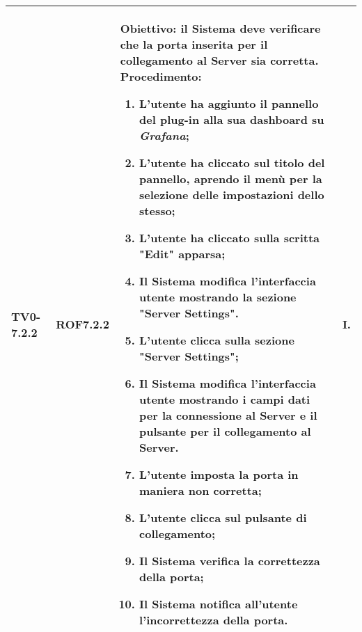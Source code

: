 \begin{longtable}{|C{.15\textwidth}|C{.13\textwidth}|m{.52\textwidth}|C{.08\textwidth}|}
TV0-7.2.2 & ROF7.2.2 &
	\textbf{Obiettivo}: il Sistema deve verificare che la porta inserita per il collegamento al Server sia corretta. \newline
	\textbf{Procedimento}:
	\begin{enumerate}
		\item L'utente ha aggiunto il pannello del plug-in alla sua dashboard su \textit{Grafana};
		\item L'utente ha cliccato sul titolo del pannello, aprendo il menù per la selezione delle impostazioni dello stesso;
		\item L'utente ha cliccato sulla scritta "Edit" apparsa;
		\item Il Sistema modifica l'interfaccia utente mostrando la sezione "Server Settings".
		\item L'utente clicca sulla sezione "Server Settings";
		\item Il Sistema modifica l'interfaccia utente mostrando i campi dati per la connessione al Server e il pulsante per il collegamento al Server.
		\item L'utente imposta la porta in maniera non corretta;
		\item L'utente clicca sul pulsante di collegamento;
		\item Il Sistema verifica la correttezza della porta;
		\item Il Sistema notifica all'utente l'incorrettezza della porta.
	\end{enumerate}
	& I. \\
\hline


\end{longtable}

